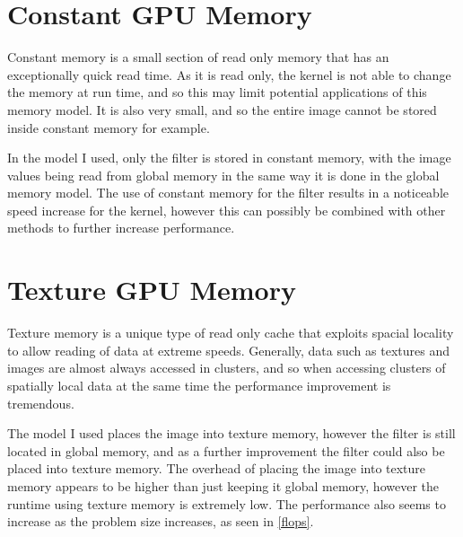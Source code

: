 \documentclass[a4paper,twoside,11pt]{report}
\begin{document}
\section{Constant GPU Memory}
Constant memory is a small section of read only memory that has an exceptionally quick read time. As it is read only, the kernel is not able to change the memory at run time, and so this may limit potential applications of this memory model. It is also very small, and so the entire image cannot be stored inside constant memory for example.

In the model I used, only the filter is stored in constant memory, with the image values being read from global memory in the same way it is done in the global memory model. The use of constant memory for the filter results in a noticeable speed increase for the kernel, however this can possibly be combined with other methods to further increase performance.

\section{Texture GPU Memory}
Texture memory is a unique type of read only cache that exploits spacial locality to allow reading of data at extreme speeds. Generally, data such as textures and images are almost always accessed in clusters, and so when accessing clusters of spatially local data at the same time the performance improvement is tremendous.

The model I used places the image into texture memory, however the filter is still located in global memory, and as a further improvement the filter could also be placed into texture memory. The overhead of placing the image into texture memory appears to be higher than just keeping it global memory, however the runtime using texture memory is extremely low. The performance also seems to increase as the problem size increases, as seen in \cref{flops}.
\end{document}
